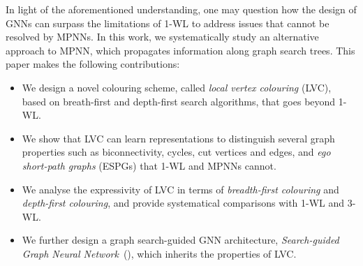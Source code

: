 In light of the aforementioned understanding, one may question how the design of GNNs can surpass the limitations of 1-WL to address issues that cannot be resolved by MPNNs. %
In this work, we systematically study an alternative approach to MPNN, which propagates information along graph search trees. This paper makes the following contributions:
\begin{itemize}
    \item We design a novel colouring scheme, called \emph{local vertex colouring} (LVC), based on breath-first and depth-first search algorithms, that goes beyond 1-WL.
    \item We show that LVC can learn representations to distinguish several graph properties such as biconnectivity, cycles, cut vertices and edges, and \textit{ego short-path graphs} (ESPGs) that 1-WL and MPNNs cannot.
    \item We analyse the expressivity of LVC in terms of  \emph{breadth-first colouring} and \emph{depth-first colouring}, and provide systematical comparisons with 1-WL and 3-WL. 
    \item We further design a graph search-guided GNN architecture, \textit{Search-guided Graph Neural Network}~(\model{}), which inherits the properties of LVC.
\end{itemize}
